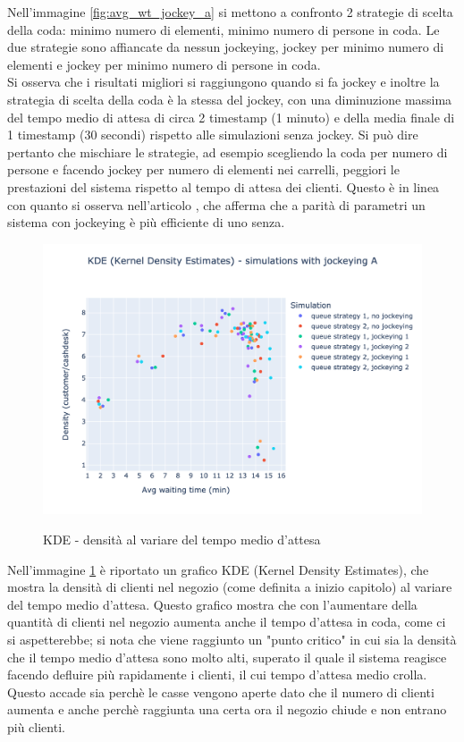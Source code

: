 Nell'immagine \ref{fig:avg_wt_jockey_a} si mettono a confronto 2 strategie di scelta della coda: minimo numero di elementi, minimo numero di persone in coda. Le due strategie sono affiancate da nessun jockeying, jockey per minimo numero di elementi e jockey per minimo numero di persone in coda. \\ 
Si osserva che i risultati migliori si raggiungono quando si fa jockey e inoltre la strategia di scelta della coda è la stessa del jockey, con una diminuzione massima del tempo medio di attesa di circa 2 timestamp (1 minuto) e della media finale di 1 timestamp (30 secondi) rispetto alle simulazioni senza jockey. Si può dire pertanto che mischiare le strategie, ad esempio scegliendo la coda per numero di persone e facendo jockey per numero di elementi nei carrelli, peggiori le prestazioni del sistema rispetto al tempo di attesa dei clienti. Questo è in linea con quanto si osserva nell'articolo \cite{xu1996dynamic}, che afferma	che a parità di parametri un sistema con jockeying è più efficiente di uno senza.

\begin{figure}[H]
	\centering
	\includegraphics[width=12cm]{"images/results/kde_jockey_a.png"}
	\label{fig:kde_jockey_a}
	\caption{KDE - densità al variare del tempo medio d'attesa}
\end{figure}

Nell'immagine \ref{fig:kde_jockey_a} è riportato un grafico KDE (Kernel Density Estimates), che mostra la densità di clienti nel negozio (come definita a inizio capitolo) al variare del tempo medio d'attesa. Questo grafico mostra che con l'aumentare della quantità di clienti nel negozio aumenta anche il tempo d'attesa in coda, come ci si aspetterebbe; si nota che viene raggiunto un "punto critico" in cui sia la densità che il tempo medio d'attesa sono molto alti, superato il quale il sistema reagisce facendo defluire più rapidamente i clienti, il cui tempo d'attesa medio crolla. Questo accade sia perchè le casse vengono aperte dato che il numero di clienti aumenta e anche perchè raggiunta una certa ora il negozio chiude e non entrano più clienti.

